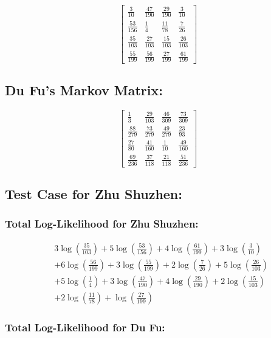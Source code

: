 \documentclass[12pt]{article}
\begin{document}
\[
\begin{bmatrix}
\frac{3}{10} & \frac{47}{190} & \frac{29}{190} & \frac{3}{10} \\
\frac{53}{156} & \frac{1}{4} & \frac{11}{78} & \frac{7}{26} \\
\frac{35}{103} & \frac{27}{103} & \frac{15}{103} & \frac{26}{103} \\
\frac{55}{199} & \frac{56}{199} & \frac{27}{199} & \frac{61}{199}
\end{bmatrix}
\]

\subsection*{Du Fu's Markov Matrix:}

\[
\begin{bmatrix}
\frac{1}{3} & \frac{29}{103} & \frac{46}{309} & \frac{73}{309} \\
\frac{88}{279} & \frac{73}{279} & \frac{49}{279} & \frac{23}{93} \\
\frac{27}{80} & \frac{41}{160} & \frac{1}{10} & \frac{49}{160} \\
\frac{69}{236} & \frac{37}{118} & \frac{21}{118} & \frac{51}{236}
\end{bmatrix}
\]

\subsection*{Test Case for Zhu Shuzhen: }

\subsubsection*{Total Log-Likelihood for Zhu Shuzhen:}

\begin{align*}
& 3 \log\left(\frac{35}{103}\right) + 5 \log\left(\frac{53}{156}\right) + 4 \log\left(\frac{61}{199}\right) + 3 \log\left(\frac{3}{10}\right) \\
& + 6 \log\left(\frac{56}{199}\right) + 3 \log\left(\frac{55}{199}\right) + 2 \log\left(\frac{7}{26}\right) + 5 \log\left(\frac{26}{103}\right) \\
& + 5 \log\left(\frac{1}{4}\right) + 3 \log\left(\frac{47}{190}\right) + 4 \log\left(\frac{29}{190}\right) + 2 \log\left(\frac{15}{103}\right) \\
& + 2 \log\left(\frac{11}{78}\right) + \log\left(\frac{27}{199}\right)
\end{align*}

\subsubsection*{Total Log-Likelihood for Du Fu:}
\end{document}
